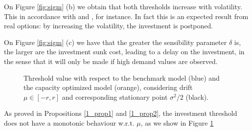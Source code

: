 On Figure \ref{fig:sigm} (b) we obtain that both thresholds increase with volatility. This in accordance with \cite{hagspiel:cap} and \cite{rita}, for instance. In fact this is an expected result from real options: by increasing the volatility, the investment is postponed.

On Figure \ref{fig:sigm} (c) we have that the greater the sensibility parameter $\delta$ is, the larger are the investment sunk cost, leading to a delay on the investment, in the sense that it will only be made if high demand values are observed.

\begin{figure}[!htb]
	\begin{subfigmatrix}{2}
	\end{subfigmatrix}
	\caption{Threshold value with respect to the benchmark model (blue) and the capacity optimized model (orange), considering drift $\mu \in [-r, r]$ and corresponding stationary point $\sigma^2/2$ (black).}
	\label{fig:mu}
\end{figure}

As proved in Propositions \ref{1_prop1} and \ref{1_prop2}, the investment threshold does not have a monotonic behaviour w.r.t. $\mu$, as we show in Figure \ref{fig:mu}

